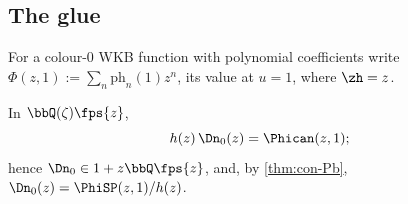 
\subsection{The glue}
\label{sec:con-glue}

For a colour-$0$ WKB function with polynomial coefficients write $\Phi(z,1):=\sum_n\mathrm{ph}_n(1)z^n$, its value at $u=1$, where $\zh=z$.

\begin{thm}
\label{thm:con-glue}
In $\bbQ(\zeta)\fps{z}$,
\begin{equation}
\label{eq:con-glue}
h(z)\,\Dn_0(z)=\Phican(z,1);
\end{equation}
hence $\Dn_0\in1+z\bbQ\fps{z}$, and, by \cref{thm:con-Pb}, $\Dn_0(z)=\PhiSP(z,1)/h(z)$.
\end{thm}

